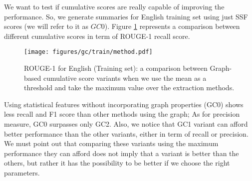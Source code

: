 We want to test if cumulative scores are really capable of improving the performance. 
So, we generate summaries for English training set using just SSF scores (we will refer to it as $ GC0 $). 
Figure \ref{fig:method} represents a comparison between different cumulative scores in term of ROUGE-1 recall score.
\begin{figure}[ht]
	\centering
	\texttt{[image: figures/gc/train/method.pdf]} %
	\caption{ROUGE-1 for English (Training set):  a comparison between 
		Graph-based cumulative score variants when we use the mean as a threshold and take 
		the maximum value over the extraction methods.}
	\label{fig:method}
\end{figure}

Using statistical features without incorporating graph properties (GC0) shows less recall and F1 score than other methods using the graph; As for precision measure, GC0 surpasses only GC2. 
Also, we notice that GC1 variant can afford better performance than the other variants, either in term of recall or precision. 
We must point out that comparing these variants using the maximum performance they can afford does not imply that a variant is better than the others, but rather it has the possibility to be better if we choose the right parameters.


%

